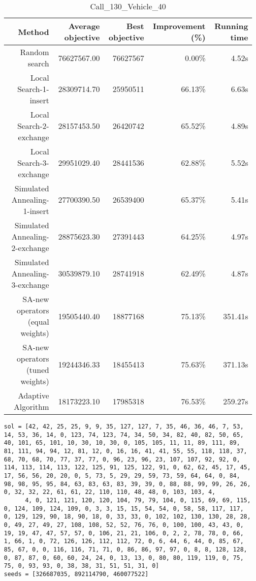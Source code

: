 \begin{table}[ht]
\centering
\caption{Call\_130\_Vehicle\_40}
\label{tab:call130vehicle40}
\begin{tabular}{|r|r|r|r|r|}
Method & Average objective & Best objective & Improvement (\%) & Running time \\
\hline
Random search & 76627567.00 & 76627567 & 0.00\% & 4.52s\\
Local Search-1-insert & 28309714.70 & 25950511 & 66.13\% & 6.63s\\
Local Search-2-exchange & 28157453.50 & 26420742 & 65.52\% & 4.89s\\
Local Search-3-exchange & 29951029.40 & 28441536 & 62.88\% & 5.52s\\
Simulated Annealing-1-insert & 27700390.50 & 26539400 & 65.37\% & 5.41s\\
Simulated Annealing-2-exchange & 28875623.30 & 27391443 & 64.25\% & 4.97s\\
Simulated Annealing-3-exchange & 30539879.10 & 28741918 & 62.49\% & 4.87s\\
SA-new operators (equal weights) & 19505440.40 & 18877168 & 75.13\% & 351.41s\\
SA-new operators (tuned weights) & 19244346.33 & 18455413 & 75.63\% & 371.13s\\
Adaptive Algorithm & 18173223.10 & 17985318 & 76.53\% & 259.27s\\
\end{tabular}%
\end{table}
\begin{lstlisting}[label={lst:call130vehicle40},caption=Optimal solution call\_130\_vehicle\_40]
sol = [42, 42, 25, 25, 9, 9, 35, 127, 127, 7, 35, 46, 36, 46, 7, 53, 14, 53, 36, 14, 0, 123, 74, 123, 74, 34, 50, 34, 82, 40, 82, 50, 65, 40, 101, 65, 101, 10, 30, 10, 30, 0, 105, 105, 11, 11, 89, 111, 89, 81, 111, 94, 94, 12, 81, 12, 0, 16, 16, 41, 41, 55, 55, 118, 118, 37, 68, 70, 68, 70, 77, 37, 77, 0, 96, 23, 96, 23, 107, 107, 92, 92, 0, 114, 113, 114, 113, 122, 125, 91, 125, 122, 91, 0, 62, 62, 45, 17, 45, 17, 56, 56, 20, 20, 0, 5, 73, 5, 29, 29, 59, 73, 59, 64, 64, 0, 84, 98, 98, 95, 95, 84, 63, 83, 63, 83, 39, 39, 0, 88, 88, 99, 99, 26, 26, 0, 32, 32, 22, 61, 61, 22, 110, 110, 48, 48, 0, 103, 103, 4,
      4, 0, 121, 121, 120, 120, 104, 79, 79, 104, 0, 115, 69, 69, 115, 0, 124, 109, 124, 109, 0, 3, 3, 15, 15, 54, 54, 0, 58, 58, 117, 117, 0, 129, 129, 90, 18, 90, 18, 0, 33, 33, 0, 102, 102, 130, 130, 28, 28, 0, 49, 27, 49, 27, 108, 108, 52, 52, 76, 76, 0, 100, 100, 43, 43, 0, 19, 19, 47, 47, 57, 57, 0, 106, 21, 21, 106, 0, 2, 2, 78, 78, 0, 66, 1, 66, 1, 0, 72, 126, 126, 112, 112, 72, 0, 6, 44, 6, 44, 0, 85, 67, 85, 67, 0, 0, 116, 116, 71, 71, 0, 86, 86, 97, 97, 0, 8, 8, 128, 128, 0, 87, 87, 0, 60, 60, 24, 24, 0, 13, 13, 0, 80, 80, 119, 119, 0, 75, 75, 0, 93, 93, 0, 38, 38, 31, 51, 51, 31, 0]
seeds = [326687035, 892114790, 460077522]
\end{lstlisting}%
\clearpage


